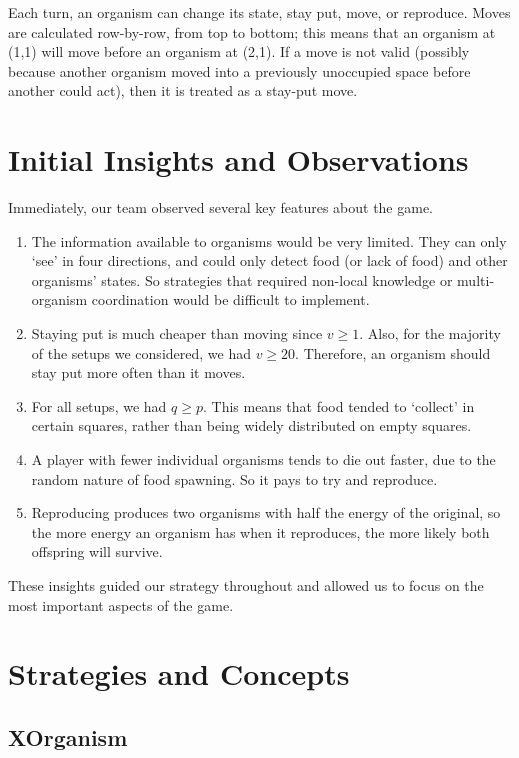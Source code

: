\documentclass[
10pt, %
letterpaper, %
oneside, %
headinclude,footinclude, %
english
]{article}
\begin{document}
Each turn, an organism can change its state, stay put, move, or reproduce. Moves are calculated row-by-row, from top to bottom; this means that an organism at (1,1) will move before an organism at (2,1). If a move is not valid (possibly because another organism moved into a previously unoccupied space before another could act), then it is treated as a stay-put move.

\section{Initial Insights and Observations}

Immediately, our team observed several key features about the game.

\begin{enumerate}
  \item The information available to organisms would be very limited. They can only `see' in four directions, and could only detect food (or lack of food) and other organisms' states. So strategies that required non-local knowledge or multi-organism coordination would be difficult to implement.
  \item Staying put is much cheaper than moving since $v \geq 1$. Also, for the majority of the setups we considered, we had $v \geq 20$. Therefore, an organism should stay put more often than it moves.
  \item For all setups, we had $q \geq p$. This means that food tended to `collect' in certain squares, rather than being widely distributed on empty squares.
  \item A player with fewer individual organisms tends to die out faster, due to the random nature of food spawning. So it pays to try and reproduce.
  \item Reproducing produces two organisms with half the energy of the original, so the more energy an organism has when it reproduces, the more likely both offspring will survive.
\end{enumerate}

These insights guided our strategy throughout and allowed us to focus on the most important aspects of the game.

\section{Strategies and Concepts}

\subsection {XOrganism}
\end{document}
